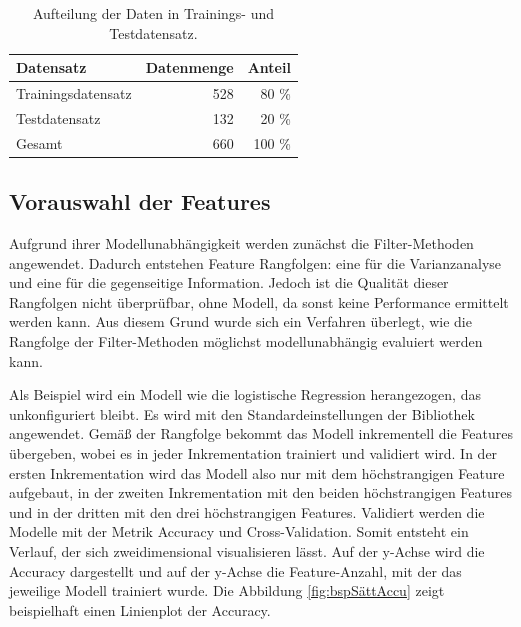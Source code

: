 \begin{table}[ht]
    \centering
    \caption{Aufteilung der Daten in Trainings- und Testdatensatz.}
    \begin{tabular}{|l|r|r|}
        \hline
        Datensatz & Datenmenge & Anteil \\
        \hline
        Trainingsdatensatz & 528 & 80 \%\\
        Testdatensatz & 132 & 20 \%\\
        \hline
        \hline
        Gesamt & 660 & 100 \%\\
        \hline
    \end{tabular}
    \label{tab:TrainTestSplit}
\end{table}

\subsection{Vorauswahl der Features} \label{sec:Meth FeatVorSele}
Aufgrund ihrer Modellunabhängigkeit werden zunächst die Filter-Methoden angewendet. Dadurch entstehen  Feature Rangfolgen: eine für die Varianzanalyse und eine für die gegenseitige Information. Jedoch ist die Qualität dieser Rangfolgen nicht überprüfbar, ohne Modell, da sonst keine Performance ermittelt werden kann. Aus diesem Grund wurde sich ein Verfahren überlegt, wie die Rangfolge der Filter-Methoden möglichst modellunabhängig evaluiert werden kann. \par

Als Beispiel wird ein Modell wie die logistische Regression herangezogen, das unkonfiguriert bleibt. Es wird mit den Standardeinstellungen der \gls{Bibliothek} angewendet. Gemäß der Rangfolge bekommt das Modell inkrementell die Features übergeben, wobei es in jeder Inkrementation trainiert und validiert wird. In der ersten Inkrementation wird das Modell also nur mit dem höchstrangigen Feature aufgebaut, in der zweiten Inkrementation mit den beiden höchstrangigen Features und in der dritten mit den drei höchstrangigen Features. Validiert werden die Modelle mit der Metrik Accuracy und Cross-Validation. Somit entsteht ein Verlauf, der sich zweidimensional visualisieren lässt. Auf der y-Achse wird die Accuracy dargestellt und auf der y-Achse die Feature-Anzahl, mit der das jeweilige Modell trainiert wurde. Die Abbildung \ref{fig:bspSättAccu} zeigt beispielhaft einen Linienplot der Accuracy. 

